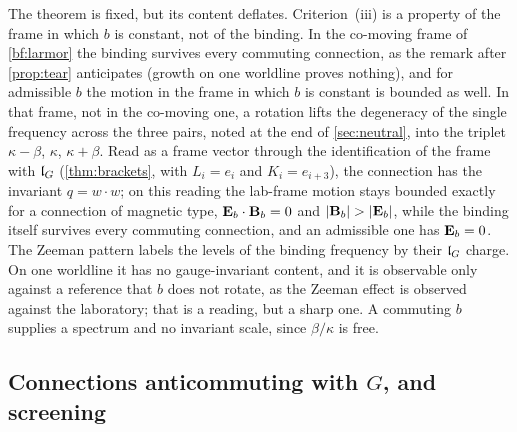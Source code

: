 The theorem is fixed, but its content deflates. Criterion~(iii) is a property of the frame in which $b$ is constant, not of the binding. In the
co-moving frame of \cref{bf:larmor} the binding survives every commuting connection, as the remark after \cref{prop:tear} anticipates (growth on
one worldline proves nothing), and for admissible $b$ the motion in the frame in which $b$ is constant is bounded as well. In that frame, not in the co-moving one, a rotation lifts the degeneracy of the single
frequency across the three pairs, noted at the end of \cref{sec:neutral}, into the triplet $\kappa-\beta$, $\kappa$, $\kappa+\beta$. Read as a
frame vector through the identification of the frame with $\mathfrak l_G$ (\cref{thm:brackets}, with $L_i=e_i$ and $K_i=e_{i+3}$), the connection
has the invariant $q=w\cdot w$; on this reading the lab-frame motion stays bounded exactly for a connection of magnetic type, $\mathbf E_b\cdot\mathbf B_b=0$ and
$|\bB_b|>|\bE_b|$, while the binding itself survives every commuting connection, and an admissible one has $\mathbf E_b=0$. The Zeeman pattern labels the
levels of the binding frequency by their $\mathfrak l_G$ charge. On one worldline it has no gauge-invariant content, and it is observable only against a
reference that $b$ does not rotate, as the Zeeman effect is observed against the laboratory; that is a reading, but a sharp one. A commuting $b$
supplies a spectrum and no invariant scale, since $\beta/\kappa$ is free.

\subsection{\texorpdfstring{Connections anticommuting with $G$, and screening}{Connections anticommuting with G, and screening}}
\label{sec:bf-anticommuting}

